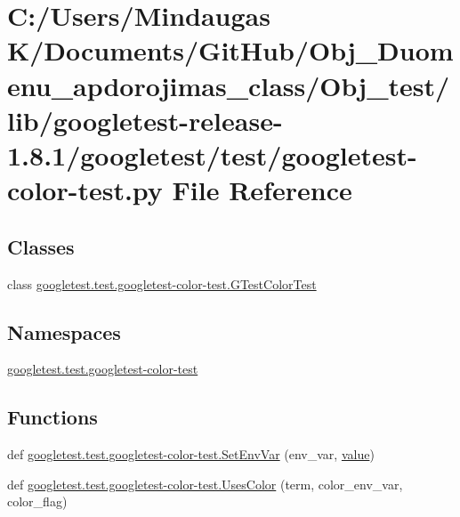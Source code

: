 \hypertarget{_obj__test_2lib_2googletest-release-1_88_81_2googletest_2test_2googletest-color-test_8py}{}\section{C\+:/\+Users/\+Mindaugas K/\+Documents/\+Git\+Hub/\+Obj\+\_\+\+Duomenu\+\_\+apdorojimas\+\_\+class/\+Obj\+\_\+test/lib/googletest-\/release-\/1.8.1/googletest/test/googletest-\/color-\/test.py File Reference}
\label{_obj__test_2lib_2googletest-release-1_88_81_2googletest_2test_2googletest-color-test_8py}
\subsection*{Classes}
\begin{DoxyCompactItemize}
\item 
class \mbox{\hyperlink{classgoogletest_1_1test_1_1googletest-color-test_1_1_g_test_color_test}{googletest.\+test.\+googletest-\/color-\/test.\+G\+Test\+Color\+Test}}
\end{DoxyCompactItemize}
\subsection*{Namespaces}
\begin{DoxyCompactItemize}
\item 
 \mbox{\hyperlink{namespacegoogletest_1_1test_1_1googletest-color-test}{googletest.\+test.\+googletest-\/color-\/test}}
\end{DoxyCompactItemize}
\subsection*{Functions}
\begin{DoxyCompactItemize}
\item 
def \mbox{\hyperlink{namespacegoogletest_1_1test_1_1googletest-color-test_ae62a6ab0c9dffae195d3ab9ee25a6ef0}{googletest.\+test.\+googletest-\/color-\/test.\+Set\+Env\+Var}} (env\+\_\+var, \mbox{\hyperlink{_obj__test_2lib_2googletest-master_2googlemock_2test_2gmock-matchers__test_8cc_a337b8a670efc0b086ad3af163f3121b6}{value}})
\item 
def \mbox{\hyperlink{namespacegoogletest_1_1test_1_1googletest-color-test_a1f9347a704ca27f7102ab14900796ab1}{googletest.\+test.\+googletest-\/color-\/test.\+Uses\+Color}} (term, color\+\_\+env\+\_\+var, color\+\_\+flag)
\end{DoxyCompactItemize}

